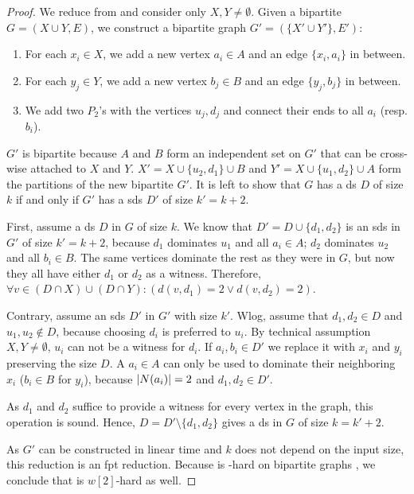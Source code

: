 \begin{proof}
    We reduce from \dom and consider only $X, Y \neq \emptyset$.
    Given a bipartite $G = ( X \cup Y, E)$, we construct a bipartite graph $G' = (\{X' \cup Y'\},E')$:
    \begin{enumerate}[topsep=0pt,itemsep=0ex,partopsep=1ex,parsep=1ex]
        \item For each $x_i \in X$, we add a new vertex $a_i \in A$  and an edge $\{x_i, a_i\}$ in between. 
        \item For each $y_j \in Y$, we add a new vertex $b_j \in B$ and an edge $\{y_j, b_j\}$ in between.
        \item We add two $P_2$'s with the vertices $u_j,d_j$ and connect their ends to all $a_i$ (resp. $b_i$).
    \end{enumerate}

    $G'$ is bipartite because $A$ and $B$ form an independent set on $G'$ that can be cross-wise attached to $X$ and $Y$. 
    $X' = X \cup \{u_2,d_1\} \cup B$ and $Y' = X \cup \{u_1,d_2\} \cup A$ form the partitions of the new bipartite $G'$.
    It is left to show that $G$ has a ds $D$ of size $k$ if and only if $G'$ has a sds $D'$ of size $k' = k + 2$.
 
    First, assume a ds $D$ in $G$ of size $k$. 
    We know that $D' = D\cup \{d_1,d_2\}$ is an sds in $G'$ of size $k' = k + 2$, because $d_1$ dominates $u_1$ and all $a_i \in A$; $d_2$ dominates $u_2$ and all $b_i \in B$. 
    The same vertices dominate the rest as they were in $G$, but now they all have either $d_1$ or $d_2$ as a witness.
    Therefore,  $\forall v \in (D \cap X) \cup (D \cap Y): (d(v, d_1) = 2 \vee d(v, d_2)=2)$.

    Contrary, assume an sds $D'$ in $G'$ with size $k'$. 
    Wlog, assume that $d_1, d_2 \in D$ and $u_1,u_2 \notin D$, because choosing $d_i$ is preferred to $u_i$.
    By technical assumption $X, Y \neq \emptyset$, $u_i$ can not be a witness for $d_i$.
    If $a_i,b_i \in D'$ we replace it with $x_i$ and $y_i$ preserving the size $D$.
    A $a_i \in A$ can only be used to dominate their neighboring $x_i$ ($b_i \in B$ for $y_i$), because $\abs{N(a_i)} = 2$ and $d_1,d_2\in D'$.

    As $d_1$ and $d_2$ suffice to provide a witness for every vertex in the graph, this operation is sound.
    Hence, $D = D' \setminus \{ d_1,d_2\}$ gives a ds in $G$ of size $ k = k' + 2$.

    As $G'$ can be constructed in linear time and $k$ does not depend on the input size, this reduction is an fpt reduction.  
    Because \dom is \WTWOhs-hard on bipartite graphs \cite[Th. 1]{Raman2008}, we conclude that \sdom is $w[2]$-hard as well.
\end{proof}

